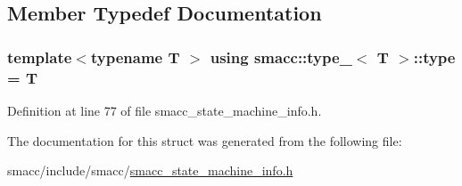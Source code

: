 \subsection{Member Typedef Documentation}
\subsubsection[{\texorpdfstring{type}{type}}]{\setlength{\rightskip}{0pt plus 5cm}template$<$typename T $>$ using {\bf smacc\+::type\+\_\+}$<$ T $>$\+::{\bf type} =  T}\hypertarget{structsmacc_1_1type___a9b8fcdd94d0e9fc71366e867a4094463}{}\label{structsmacc_1_1type___a9b8fcdd94d0e9fc71366e867a4094463}


Definition at line 77 of file smacc\+\_\+state\+\_\+machine\+\_\+info.\+h.



The documentation for this struct was generated from the following file\+:\begin{DoxyCompactItemize}
\item 
smacc/include/smacc/\hyperlink{smacc__state__machine__info_8h}{smacc\+\_\+state\+\_\+machine\+\_\+info.\+h}\end{DoxyCompactItemize}
